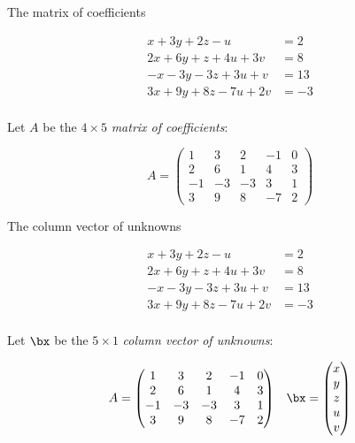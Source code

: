 \documentclass[handout]{beamer}
\begin{document}

\begin{frame}{The matrix of coefficients}

\begin{align*}
 x + 3y + 2z - u  \qquad &= 2 \\
2x + 6y + z + 4u + 3v  &= 8 \\
-x -3y  -3z + 3u + v  &= 13 \\
3x + 9y + 8z  -7u + 2v  &= -3 \\
\end{align*}

Let $A$ be the $4 \times 5$ \emph{matrix of coefficients}:

$$
A =
\begin{pmatrix}
1 & 3 & 2 & -1 & 0 \\
2 & 6 & 1 & 4 & 3\\
-1 & -3 & -3 & 3 & 1 \\
3 & 9 & 8 & -7 & 2
\end{pmatrix}
$$

\end{frame}


\begin{frame}{The column vector of unknowns}

\begin{align*}
 x + 3y + 2z - u  \qquad &= 2 \\
2x + 6y + z + 4u + 3v  &= 8 \\
-x -3y  -3z + 3u + v  &= 13 \\
3x + 9y + 8z  -7u + 2v  &= -3 \\
\end{align*}

Let $\bx$ be the $5 \times 1$  \emph{column vector of unknowns}:

$$
\begin{matrix}
A =
\begin{pmatrix}
1 & 3 & 2 & -1 & 0 \\
2 & 6 & 1 & 4 & 3\\
-1 & -3 & -3 & 3 & 1 \\
3 & 9 & 8 & -7 & 2
\end{pmatrix}
&
\bx =
\begin{pmatrix}
x \\ y \\ z \\ u \\ v
\end{pmatrix}
\end{matrix}
$$

\end{frame}
\end{document}
